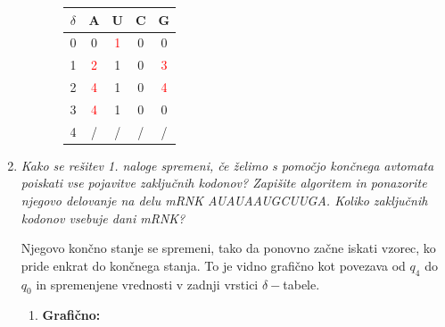 \documentclass{article}
\begin{document}
\begin{enumerate}
\begin{enumerate}
\begin{itemize}
						\begin{tabular}{|c||c|c|c|c|}
							\hline
							$\delta$ & A & U & C & G \\
							\hline \hline
							0 & 0 & \textcolor{red}{1} & 0 & 0 \\
							\hline
							1 & \textcolor{red}{2} & 1 & 0 & \textcolor{red}{3} \\
							\hline
							2 & \textcolor{red}{4} & 1 & 0 & \textcolor{red}{4} \\
							\hline
							3 & \textcolor{red}{4} & 1 & 0 & 0 \\
							\hline
							4 & / & / & / & / \\
							\hline
						\end{tabular}
				\end{itemize}
		\end{enumerate}

	\newpage

	\item \textit{Kako se rešitev 1. naloge spremeni, če želimo s pomočjo končnega
			avtomata poiskati vse pojavitve zaključnih kodonov? Zapišite algoritem
			in ponazorite njegovo delovanje na delu mRNK AUAUAAUGCUUGA. Koliko
		zaključnih kodonov vsebuje dani mRNK?}

		Njegovo končno stanje se spremeni, tako da ponovno začne iskati vzorec, ko
		pride enkrat do
		končnega stanja. To je vidno grafično kot povezava od $q_4$ do $q_0$ in
		spremenjene vrednosti v zadnji vrstici $\delta-$tabele.

		\begin{enumerate}
			\item \textbf{Grafično:}

			\begin{center}
\end{center}
\end{enumerate}
\end{enumerate}
\end{document}
